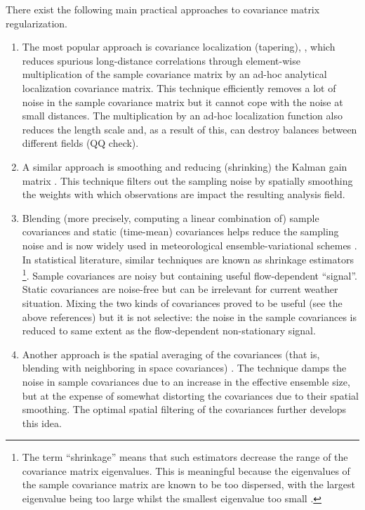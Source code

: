 \documentclass[12pt]{article}
\begin{document}
There exist the following  main practical approaches to  covariance matrix regularization.
%
\begin{enumerate}
\item
The most popular approach is covariance
localization (tapering), \citep[e.g.][]{Houtekamer1998,Furrer},
which reduces spurious long-distance correlations through element-wise multiplication
of the sample covariance matrix by an ad-hoc analytical localization covariance matrix.
This technique efficiently removes a lot of noise in the sample covariance matrix
but it cannot cope with the noise at small distances. The
multiplication by an ad-hoc localization function also reduces the length scale
and, as a result of this, can destroy balances between different fields
\citep{Houtekamer1998} (QQ check).

\item
A similar approach is smoothing and reducing (shrinking) the Kalman gain matrix \citep{SaetromOmre}.
This technique filters out the sampling noise by spatially smoothing the weights with which 
observations are impact the resulting analysis field.

\item
Blending (more precisely, computing a linear combination of) sample covariances
and static (time-mean) covariances helps
reduce the sampling noise and is now widely used in meteorological ensemble-variational schemes
\citep{Buehner2013,Lorenc}. In statistical literature, similar techniques are known
as shrinkage estimators \citep{Ledoit}
\footnote{The term ``shrinkage'' means that such estimators decrease the range of the
covariance matrix eigenvalues. This is meaningful because the eigenvalues of the
sample covariance matrix are known to be too dispersed, with the largest eigenvalue
being too large whilst the smallest
eigenvalue too small  \citep[e.g.][section 2.2]{Ledoit}.}.
Sample covariances are noisy but containing useful flow-dependent ``signal''.
Static covariances are noise-free but can be irrelevant for current weather
situation. Mixing the two kinds of covariances proved to be useful
(see the above references) but
it is not selective: the noise in the sample covariances is reduced
to same extent as the flow-dependent non-stationary signal.


\item
Another  approach is the spatial averaging of the covariances (that is, blending
with neighboring in space covariances) \citep[e.g.][]{Berre2010}.
The technique damps the noise in sample covariances
due to an increase in the effective ensemble size, but
at the expense of somewhat distorting the covariances due to their spatial smoothing.
The optimal spatial filtering of the covariances \citep{Menetrier} further develops
this idea.




\end{enumerate}
\end{document}
